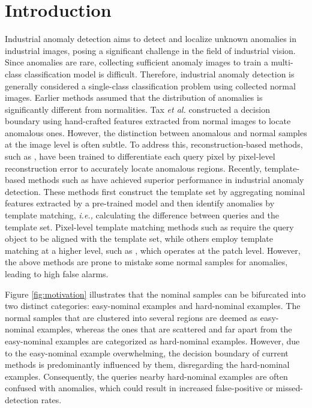 \documentclass[default,iicol]{sn-jnl}\usepackage[algo2e,ruled,linesnumbered]{algorithm2e}
\theoremstyle{thmstyleone}\newtheorem{theorem}{Theorem}\newtheorem{proposition}[theorem]{Proposition}
\theoremstyle{thmstyletwo}\newtheorem{example}{Example}\newtheorem{remark}{Remark}
\theoremstyle{thmstylethree}\newtheorem{definition}{Definition}
\begin{document}





\maketitle

\section{Introduction}
Industrial anomaly detection aims to detect and localize unknown anomalies in industrial images, posing a significant challenge in the field of industrial vision.
Since anomalies are rare, collecting sufficient anomaly images to train a multi-class classification model is difficult.
Therefore, industrial anomaly detection is generally considered a single-class classification problem using collected normal images.
Earlier methods assumed that the distribution of anomalies is significantly different from normalities.
Tax \emph{et al.} \cite{SVDD} constructed a decision boundary using hand-crafted features extracted from normal images to locate anomalous ones.
However, the distinction between anomalous and normal samples at the image level is often subtle.
To address this, reconstruction-based methods, such as \cite{AnoGAN,SSIM-AE,US,MKD,MVTECLOCO}, have been trained to differentiate each query pixel by pixel-level reconstruction error to accurately locate anomalous regions.
Recently, template-based methods such as \cite{SPADE, Padim, patchcore} have achieved superior performance in industrial anomaly detection.
These methods first construct the template set by aggregating nominal features extracted by a pre-trained model and then identify anomalies by template matching, \emph{i.e.,} calculating the difference between queries and the template set.
Pixel-level template matching methods such as \cite{SPADE} require the query object to be aligned with the template set, while others employ template matching at a higher level, such as \cite{patchcore}, which operates at the patch level.
However, the above methods are prone to mistake some normal samples for anomalies, leading to high false alarms.



Figure \ref{fig:motivation} illustrates that the nominal samples can be bifurcated into two distinct categories: easy-nominal examples and hard-nominal examples.
The normal samples that are clustered into several regions are deemed as easy-nominal examples, whereas the ones that are scattered and far apart from the easy-nominal examples are categorized as hard-nominal examples.
However, due to the easy-nominal example overwhelming, the decision boundary of current methods is predominantly influenced by them, disregarding the hard-nominal examples.
Consequently, the queries nearby hard-nominal examples are often confused with anomalies, which could result in increased false-positive or missed-detection rates.
\end{document}
